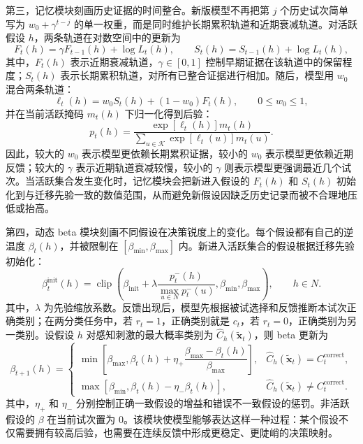 第三，记忆模块刻画历史证据的时间整合。新版模型不再把第 $j$ 个历史试次简单写为 $w_0+\gamma^{t-j}$ 的单一权重，而是同时维护长期累积轨道和近期衰减轨道。对活跃假设 $h$，两条轨道在对数空间中的更新为
\begin{equation}
    F_t(h)=\gamma F_{t-1}(h)+\log L_t(h),
    \qquad
    S_t(h)=S_{t-1}(h)+\log L_t(h),
    \label{eq:exp1-memory}
\end{equation}
其中，$F_t(h)$ 表示近期衰减轨道，$\gamma\in[0,1]$ 控制早期证据在该轨道中的保留程度；$S_t(h)$ 表示长期累积轨道，对所有已整合证据进行相加。随后，模型用 $w_0$ 混合两条轨道：
\begin{equation}
    \ell_t(h)
    =
    w_0 S_t(h)+(1-w_0)F_t(h),
    \qquad 0\leq w_0\leq 1,
    \label{eq:exp1-memory-combine}
\end{equation}
并在当前活跃掩码 $m_t(h)$ 下归一化得到后验：
\begin{equation}
    p_t(h)
    =
    \frac{\exp[\ell_t(h)]m_t(h)}
    {\sum_{u\in\mathcal K}\exp[\ell_t(u)]m_t(u)}.
    \label{eq:exp1-memory-posterior}
\end{equation}
因此，较大的 $w_0$ 表示模型更依赖长期累积证据，较小的 $w_0$ 表示模型更依赖近期反馈；较大的 $\gamma$ 表示近期轨道衰减较慢，较小的 $\gamma$ 则表示模型更强调最近几个试次。当活跃集合发生变化时，记忆模块会把新进入假设的 $F_t(h)$ 和 $S_t(h)$ 初始化到与迁移先验一致的数值范围，从而避免新假设因缺乏历史记录而被不合理地压低或抬高。

第四，动态 beta 模块刻画不同假设在决策锐度上的变化。每个假设都有自己的逆温度 $\beta_t(h)$，并被限制在 $[\beta_{\min},\beta_{\max}]$ 内。新进入活跃集合的假设根据迁移先验初始化：
\begin{equation}
    \beta_t^{\mathrm{init}}(h)
    =
    \operatorname{clip}
    \left(
        \beta_{\mathrm{init}}+
        \lambda\frac{p_t^-(h)}{\max_{u\in N}p_t^-(u)},
        \beta_{\min},
        \beta_{\max}
    \right),
    \qquad h\in N.
    \label{eq:exp1-beta-init}
\end{equation}
其中，$\lambda$ 为先验缩放系数。反馈出现后，模型先根据被试选择和反馈推断本试次正确类别；在两分类任务中，若 $r_t=1$，正确类别就是 $c_t$，若 $r_t=0$，正确类别为另一类别。设假设 $h$ 对感知刺激的最大概率类别为 $\hat C_h(\tilde{\mathbf{x}}_t)$，则 beta 更新为
\begin{equation}
    \beta_{t+1}(h)=
    \begin{cases}
        \min\left[\beta_{\max},
        \beta_t(h)+\eta_+\dfrac{\beta_{\max}-\beta_t(h)}{\beta_{\max}}\right],
        & \hat C_h(\tilde{\mathbf{x}}_t)=C_t^{\mathrm{correct}},\\[8pt]
        \max\left[\beta_{\min},
        \beta_t(h)-\eta_-\beta_t(h)\right],
        & \hat C_h(\tilde{\mathbf{x}}_t)\neq C_t^{\mathrm{correct}}.
    \end{cases}
    \label{eq:exp1-beta-update}
\end{equation}
其中，$\eta_+$ 和 $\eta_-$ 分别控制正确一致假设的增益和错误不一致假设的惩罚。非活跃假设的 $\beta$ 在当前试次置为 0。该模块使模型能够表达这样一种过程：某个假设不仅需要拥有较高后验，也需要在连续反馈中形成更稳定、更陡峭的决策映射。

